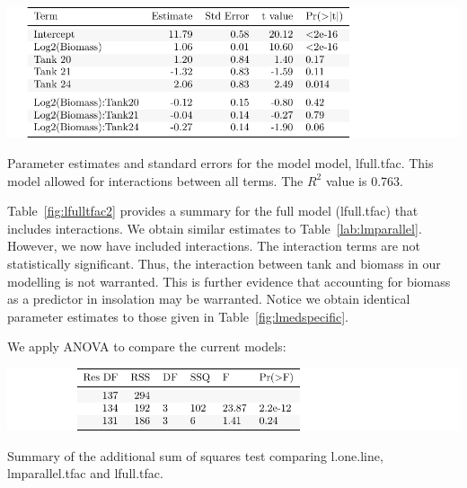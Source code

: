    \vspace{12pt}



\begin{table}[H]
\includegraphics{Chapter3Images/lfulltfac.pdf}
\caption{Parameter estimates and standard errors for the model model, lfull.tfac. This model allowed for interactions between all terms. The $R^{2}$ value is 0.763.}
\label{fig:lfulltfac2}
\end{table}

Table~\ref{fig:lfulltfac2} provides a summary for the full model (lfull.tfac) that includes interactions. We obtain similar estimates to Table~\ref{lab:lmparallel}. However, we now have included interactions. The interaction terms are not statistically significant.  Thus, the interaction between tank and biomass in our modelling is not warranted. This is further evidence that accounting for biomass as a predictor in insolation may be warranted. Notice we obtain identical parameter estimates to those given in Table~\ref{fig:lmedspecific}.

\newpage

We apply ANOVA to compare the current models:

   \vspace{12pt}



\begin{table}[H]
\includegraphics{Chapter3Images/anova1.pdf}
\caption{Summary of the additional sum of squares test comparing l.one.line,  lmparallel.tfac and lfull.tfac.}
\label{fig:anovacompare2}
\end{table}


